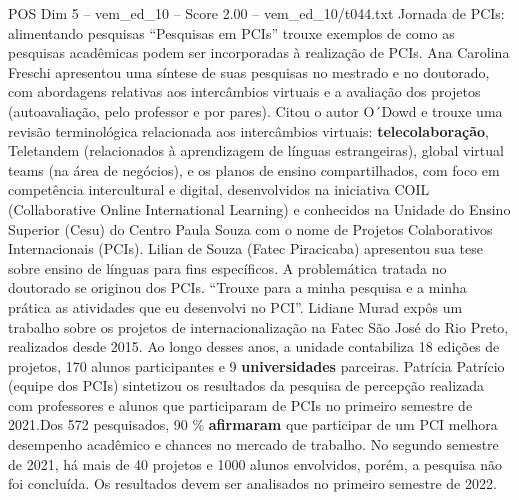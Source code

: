 \begin{textsample}{POS Dim 5 – vem\_ed\_10 – Score 2.00 – vem\_ed\_10/t044.txt}  \label{ex:f5_pos_128}
Jornada de PCIs: alimentando pesquisas “Pesquisas em PCIs” trouxe exemplos de como as pesquisas acadêmicas podem ser incorporadas à realização de PCIs.
Ana Carolina Freschi apresentou uma síntese de suas pesquisas no mestrado e no doutorado, com abordagens relativas aos intercâmbios virtuais e a avaliação dos projetos (autoavaliação, pelo professor e por pares).
Citou o autor O´Dowd e trouxe uma revisão terminológica relacionada aos intercâmbios virtuais: \textbf{telecolaboração}, Teletandem (relacionados à aprendizagem de línguas estrangeiras), global virtual teams (na área de negócios), e os planos de ensino compartilhados, com foco em competência intercultural e digital, desenvolvidos na iniciativa COIL (Collaborative Online International Learning) e conhecidos na Unidade do Ensino Superior (Cesu) do Centro Paula Souza com o nome de Projetos Colaborativos Internacionais (PCIs).
Lilian de Souza (Fatec Piracicaba) apresentou sua tese sobre ensino de línguas para fins específicos.
A problemática tratada no doutorado se originou dos PCIs. “Trouxe para a minha pesquisa e a minha prática as atividades que eu desenvolvi no PCI”.
Lidiane Murad expôs um trabalho sobre os projetos de internacionalização na Fatec São José do Rio Preto, realizados desde 2015.
Ao longo desses anos, a unidade contabiliza 18 edições de projetos, 170 alunos participantes e 9 \textbf{universidades} parceiras.
Patrícia Patrício (equipe dos PCIs) sintetizou os resultados da pesquisa de percepção realizada com professores e alunos que participaram de PCIs no primeiro semestre de 2021.Dos 572 pesquisados, 90 \% \textbf{afirmaram} que participar de um PCI melhora desempenho acadêmico e chances no mercado de trabalho.
No segundo semestre de 2021, há mais de 40 projetos e 1000 alunos envolvidos, porém, a pesquisa não foi concluída.
Os resultados devem ser analisados no primeiro semestre de 2022.

\end{textsample}
